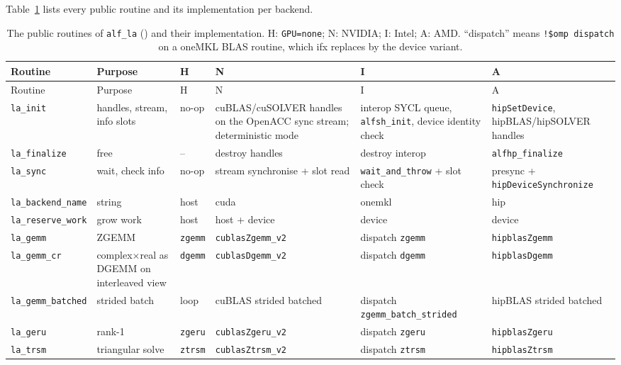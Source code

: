 Table~\ref{tab:la} lists every public routine and its implementation per backend.

\begin{footnotesize}\setlength{\tabcolsep}{3pt}
\begin{longtable}{@{}>{\raggedright}p{2.5cm}>{\raggedright}p{2.5cm}>{\raggedright}p{2.1cm}>{\raggedright}p{2.8cm}>{\raggedright}p{2.8cm}>{\raggedright\arraybackslash}p{2.6cm}@{}}
\caption{The public routines of \texttt{alf\_la} () and their implementation. H: \texttt{GPU=none}; N: NVIDIA; I: Intel; A: AMD. ``dispatch'' means \texttt{!\$omp dispatch} on a oneMKL BLAS routine, which ifx replaces by the device variant.}\label{tab:la}\\
\toprule
Routine & Purpose & H & N & I & A \\
\midrule\endfirsthead
\toprule
Routine & Purpose & H & N & I & A \\
\midrule\endhead
\texttt{la\_init} & handles, stream, info slots & no-op & cuBLAS/cuSOLVER handles on the OpenACC sync stream; deterministic mode & interop SYCL queue, \texttt{alfsh\_init}, device identity check & \texttt{hipSetDevice}, hipBLAS/hipSOLVER handles \\
\texttt{la\_finalize} & free & -- & destroy handles & destroy interop & \texttt{alfhp\_finalize} \\
\texttt{la\_sync} & wait, check info & no-op & stream synchronise + slot read & \texttt{wait\_and\_throw} + slot check & presync + \texttt{hipDeviceSynchronize} \\
\texttt{la\_backend\_name} & string & host & cuda & onemkl & hip \\
\texttt{la\_reserve\_work} & grow work & host & host + device & device & device \\
\texttt{la\_gemm} & ZGEMM & \texttt{zgemm} & \texttt{cublasZgemm\_v2} & dispatch \texttt{zgemm} & \texttt{hipblasZgemm} \\
\texttt{la\_gemm\_cr} & complex$\times$real as DGEMM on interleaved view & \texttt{dgemm} & \texttt{cublasDgemm\_v2} & dispatch \texttt{dgemm} & \texttt{hipblasDgemm} \\
\texttt{la\_gemm\_batched} & strided batch & loop & cuBLAS strided batched & dispatch \texttt{zgemm\_batch\_strided} & hipBLAS strided batched \\
\texttt{la\_geru} & rank-1 & \texttt{zgeru} & \texttt{cublasZgeru\_v2} & dispatch \texttt{zgeru} & \texttt{hipblasZgeru} \\
\texttt{la\_trsm} & triangular solve & \texttt{ztrsm} & \texttt{cublasZtrsm\_v2} & dispatch \texttt{ztrsm} & \texttt{hipblasZtrsm} \\

\end{longtable}
\end{footnotesize}
